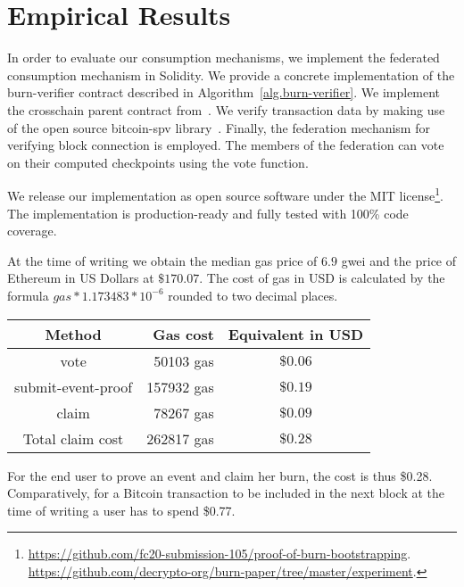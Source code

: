 \section{Empirical Results}
In order to evaluate our consumption mechanisms, we implement the federated consumption mechanism in Solidity. We provide a concrete implementation of the \textsf{burn-verifier} contract described in Algorithm~\ref{alg.burn-verifier}. We implement the \textsf{crosschain} parent contract from~\cite{pow-sidechains}. We verify transaction data by making use of the open source bitcoin-spv library~\cite{bitcoin-spv-library}. Finally, the federation mechanism for verifying block connection is employed. The members of the federation can vote on their computed checkpoints using the \textsf{vote} function.

We release our implementation as open source software under the MIT license\footnote{
    \ifanonymous
        \url{https://github.com/fc20-submission-105/proof-of-burn-bootstrapping}.
    \else
        \url{https://github.com/decrypto-org/burn-paper/tree/master/experiment}.
    \fi
}.
The implementation is production-ready and fully tested with 100\% code coverage.

At the time of writing we obtain the median gas price of $6.9$ gwei and the price of Ethereum in US Dollars at $\$170.07$. The cost of gas in USD is calculated by the formula $gas * 1.173483 * 10^{-6}$ rounded to two decimal places.

\begin{center}
    \begin{tabular}{ |c|r|c| }
     \hline
     Method                         & Gas cost   & Equivalent in USD \\
     \hline
     \textsf{vote}                  & 50103 gas  & $\$0.06$ \\
     \hline
     \textsf{submit-event-proof}    & 157932 gas & $\$0.19$ \\
     \textsf{claim}                 & 78267 gas  & $\$0.09$ \\
     Total claim cost               & 262817 gas & $\$0.28$ \\
     \hline
    \end{tabular}
\end{center}

For the end user to prove an event and claim her burn, the cost is thus \$0.28. Comparatively, for a Bitcoin transaction to be included in the next block at the time of writing a user has to spend \$0.77.
